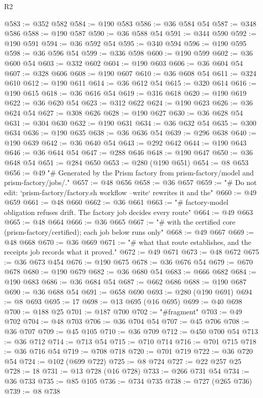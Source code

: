 \begin{lexlean}{R2}
\begin{coremodule}
@583 := @352 @582
@584 := @190 @583
@586 := @36 @584 @54
@587 := @348 @586
@588 := @190 @587
@590 := @36 @588 @54
@591 := @344 @590
@592 := @190 @591
@594 := @36 @592 @54
@595 := @340 @594
@596 := @190 @595
@598 := @36 @596 @54
@599 := @336 @598
@600 := @190 @599
@602 := @36 @600 @54
@603 := @332 @602
@604 := @190 @603
@606 := @36 @604 @54
@607 := @328 @606
@608 := @190 @607
@610 := @36 @608 @54
@611 := @324 @610
@612 := @190 @611
@614 := @36 @612 @54
@615 := @320 @614
@616 := @190 @615
@618 := @36 @616 @54
@619 := @316 @618
@620 := @190 @619
@622 := @36 @620 @54
@623 := @312 @622
@624 := @190 @623
@626 := @36 @624 @54
@627 := @308 @626
@628 := @190 @627
@630 := @36 @628 @54
@631 := @304 @630
@632 := @190 @631
@634 := @36 @632 @54
@635 := @300 @634
@636 := @190 @635
@638 := @36 @636 @54
@639 := @296 @638
@640 := @190 @639
@642 := @36 @640 @54
@643 := @292 @642
@644 := @190 @643
@646 := @36 @644 @54
@647 := @288 @646
@648 := @190 @647
@650 := @36 @648 @54
@651 := @284 @650
@653 := @280 (@190 @651)
@654 := @8 @653
@656 := @49 "# Generated by the Prism factory from prism-factory/model and prism-factory/jobs/."
@657 := @48 @656
@658 := @36 @657
@659 := "# Do not edit: `prism-factory/factory.sh workflow --write` rewrites it and the"
@660 := @49 @659
@661 := @48 @660
@662 := @36 @661
@663 := "# factory-model obligation refuses drift. The factory job decides every route"
@664 := @49 @663
@665 := @48 @664
@666 := @36 @665
@667 := "# with the certified core (prism-factory/certified); each job below runs only"
@668 := @49 @667
@669 := @48 @668
@670 := @36 @669
@671 := "# what that route establishes, and the receipts job records what it proved."
@672 := @49 @671
@673 := @48 @672
@675 := @36 @673 @454
@676 := @190 @675
@678 := @36 @676 @54
@679 := @670 @678
@680 := @190 @679
@682 := @36 @680 @54
@683 := @666 @682
@684 := @190 @683
@686 := @36 @684 @54
@687 := @662 @686
@688 := @190 @687
@690 := @36 @688 @54
@691 := @658 @690
@693 := @280 (@190 @691)
@694 := @8 @693
@695 := 17
@698 := @13 @695 (@16 @695)
@699 := @40 @698
@700 := @188 @25
@701 := @187 @700
@702 := "#fragment"
@703 := @49 @702
@704 := @48 @703
@706 := @36 @704 @54
@707 := @45 @706
@708 := @36 @707
@709 := @45 @105
@710 := @36 @709
@712 := @450 @700 @54
@713 := @36 @712
@714 := @713 @54
@715 := @710 @714
@716 := @701 @715
@718 := @36 @716 @54
@719 := @708 @718
@720 := @701 @719
@722 := @36 @720 @54
@724 := @102 (@699 @722)
@725 := @8 @724
@727 := @22 @257 @25
@728 := 18
@731 := @13 @728 (@16 @728)
@733 := @266 @731 @54
@734 := @36 @733
@735 := @85 @105
@736 := @734 @735
@738 := @727 (@265 @736)
@739 := @8 @738

\end{coremodule}
\end{lexlean}
